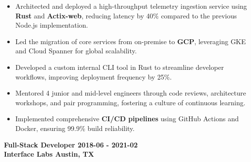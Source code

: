 \documentclass[11pt,letterpaper]{article}
\begin{document}
        \begin{itemize}[label=\textbullet]
        
            \item
            
                Architected and deployed a high-throughput telemetry ingestion service using \textbf{Rust} and \textbf{Actix-web}, reducing latency by 40\% compared to the previous Node.js implementation.
            
            
            
        
            \item
            
                Led the migration of core services from on-premise to \textbf{GCP}, leveraging GKE and Cloud Spanner for global scalability.
            
            
            
        
            \item
            
                Developed a custom internal CLI tool in Rust to streamline developer workflows, improving deployment frequency by 25\%.
            
            
            
        
            \item
            
                Mentored 4 junior and mid-level engineers through code reviews, architecture workshops, and pair programming, fostering a culture of continuous learning.
            
            
            
        
            \item
            
                Implemented comprehensive \textbf{CI/CD pipelines} using GitHub Actions and Docker, ensuring 99.9\% build reliability.
            
            
            
        
        \end{itemize}
    
    \vspace{6pt}

    \color{sectioncolor}
    \textbf{
        Full-Stack Developer
        \hfill
        2018-06 - 2021-02 \\
        Interface Labs
        \hfill
        Austin, TX \\
    }
\end{document}
